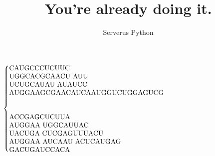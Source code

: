 \documentclass[20pt,a4paper]{extarticle}
\title{You're already doing it.}
\author{Serverus Python}
\begin{document}
\maketitle
$\begin{cases}
\parbox{\textwidth}{CAUGCCCUCUUC\\
UGGCACGCAACU
AUU \\
UCUGCAUAU 
AUAUCC \\
AUGGAAGCGAACAUCAAUGGUCUGGAGUCG}\\
\ \\
\ \\
\parbox{\textwidth}{ACCGAGCUCUUA \\
AUGGAA 
UGGCAUUAC \\
UACUGA 
CUCGAGUUUACU\\ 
AUGGAA 
AUCAAU 
ACUCAUGAG \\
GACUGAUCCACA}
\end{cases}
$
\end{document}
